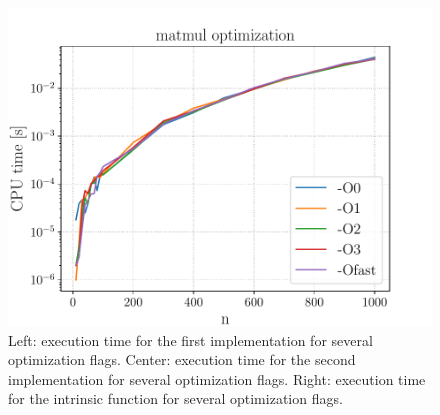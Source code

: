 \documentclass[a4paper]{article}
\begin{document}
\begin{figure}[H]
\begin{minipage}[t]{0.32\linewidth}
		\includegraphics[width=1\textwidth]{images/01_ex3_matmul_O.pdf}
	\end{minipage}
	\caption{\label{fig:01_ex3_2} Left: execution time for the first implementation for several optimization flags. Center: execution time for the second implementation for several optimization flags. Right: execution time for the intrinsic function for several optimization flags.}
\end{figure}
\end{document}
